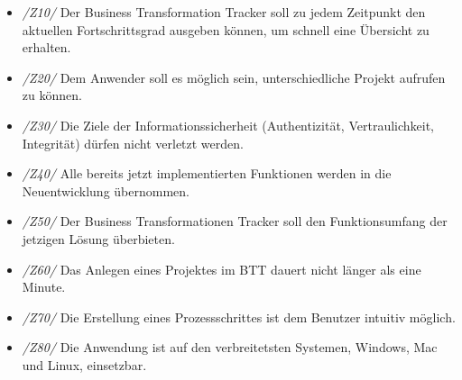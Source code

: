 \begin{itemize} 
    \item[] \emph{/Z10/} Der Business Transformation Tracker soll zu jedem Zeitpunkt den aktuellen Fortschrittsgrad ausgeben können, um schnell eine Übersicht zu erhalten.
    \item[] \emph{/Z20/} Dem Anwender soll es möglich sein, unterschiedliche Projekt aufrufen zu können.
    \item[] \emph{/Z30/} Die Ziele der Informationssicherheit (Authentizität, Vertraulichkeit, Integrität) dürfen nicht verletzt werden.
    \item[] \emph{/Z40/} Alle bereits jetzt implementierten Funktionen werden in die Neuentwicklung übernommen.         
    \item[] \emph{/Z50/} Der Business Transformationen Tracker soll den Funktionsumfang der jetzigen Lösung überbieten.  
    \item[] \emph{/Z60/} Das Anlegen eines Projektes im BTT dauert nicht länger als eine Minute.
    \item[] \emph{/Z70/} Die Erstellung eines Prozessschrittes ist dem Benutzer intuitiv möglich.
    \item[] \emph{/Z80/} Die Anwendung ist auf den verbreitetsten Systemen, Windows, Mac und Linux, einsetzbar.
\end{itemize}

